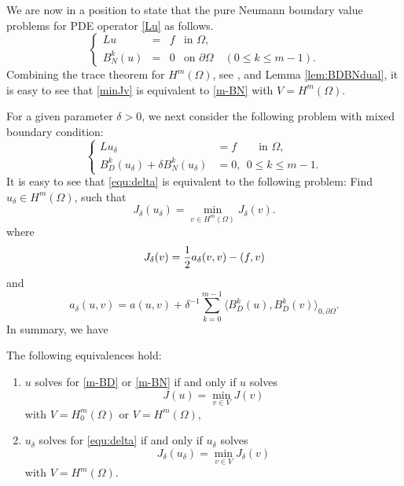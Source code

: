 We are now in a position to state that the pure Neumann boundary value
problems for PDE operator \eqref{Lu} as follows.
\begin{equation} \label{m-BN}
\left\{
  \begin{array}{rccl}
Lu &=& f &\mbox{in }\Omega, \\
B_{N}^k(u) &= &0 & \mbox{on }\partial\Omega \quad(0\le k\le m-1).
  \end{array}
\right.
\end{equation}
Combining the trace theorem for $H^m(\Omega)$, see \cite{adams2003sobolev}, and Lemma
\eqref{lem:BDBNdual},  it is easy to see that 
\eqref{minJv} is equivalent to 
\eqref{m-BN} 
with $V=H^m(\Omega)$. 

For a given parameter $\delta>0$, we next consider the following
problem with mixed boundary condition: 
\begin{equation} \label{equ:delta}
\left\{
\begin{aligned}
Lu_{\delta} &= f \qquad \mbox{in }\Omega, \\
B_D^k(u_{\delta})+\delta B_N^k(u_\delta)  &= 0, \ \ 0\le k\le m-1.
\end{aligned}
\right.
\end{equation}
It is easy to see that \eqref{equ:delta} is equivalent to the following problem: Find $u_\delta\in H^m(\Omega)$, such that 
\begin{equation}\label{equ:varpdelta}
J_{\delta}(u_{\delta})=\min_{v\in H^m(\Omega)} J_{\delta}(v).
\end{equation}
where
\begin{equation}\label{J-delta}
J_\delta(v)={1\over 2}a_\delta(v,v)-(f,v)
\end{equation}
and
\begin{equation}\label{a-delta}
a_\delta(u,v)=a(u,v)+\delta^{-1}\sum_{k=0}^{m-1}\langle B_D^k(u), B_D^k(v)\rangle_{0,\partial\Omega}.
\end{equation}
In summary, we have 
\begin{lemma}
The following equivalences hold:
\begin{enumerate}
\item $u$ solves for \eqref{m-BD} or \eqref{m-BN} if and only if $u$ solves
\begin{equation}\label{m-mini}
J(u)=\min_{v\in V} J(v)
\end{equation}
 with $V=H^m_0(\Omega)$ or  $V=H^m(\Omega)$,
\item $u_\delta$ solves for \eqref{equ:delta}  if and only if $u_\delta$ solves 
$$
\displaystyle J_\delta(u_\delta)=\min_{v\in V} J_\delta(v)
$$ 
with $V=H^m(\Omega)$. 
\end{enumerate}
\end{lemma}



